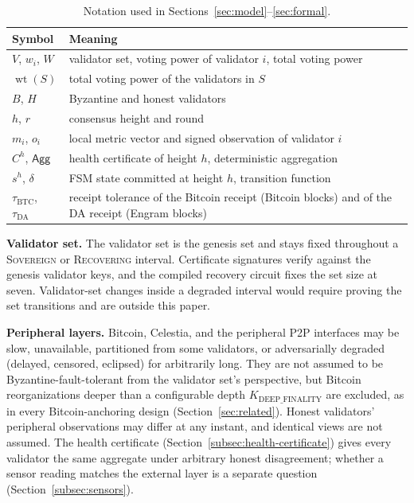 \begin{table}[tbp]
\caption{Notation used in Sections~\ref{sec:model}--\ref{sec:formal}.}
\label{tab:notation}
\centering
\footnotesize
\begin{tabular}{@{}ll@{}}
\toprule
\textbf{Symbol} & \textbf{Meaning} \\
\midrule
$V$, $w_i$, $W$ & validator set, voting power of validator $i$, total voting power \\
$\operatorname{wt}(S)$ & total voting power of the validators in $S$ \\
$B$, $H$ & Byzantine and honest validators \\
$h$, $r$ & consensus height and round \\
$m_i$, $o_i$ & local metric vector and signed observation of validator $i$ \\
$C^{h}$, $\mathsf{Agg}$ & health certificate of height $h$, deterministic aggregation \\
$s^{h}$, $\delta$ & FSM state committed at height $h$, transition function \\
$\tau_{\text{BTC}}$, $\tau_{\text{DA}}$ & receipt tolerance of the Bitcoin receipt (Bitcoin blocks) and of the DA receipt (Engram blocks) \\
\bottomrule
\end{tabular}
\end{table}

\textbf{Validator set.} The validator set is the genesis set and stays fixed
throughout a \textsc{Sovereign} or \textsc{Recovering} interval. Certificate
signatures verify against the genesis validator keys, and the compiled
recovery circuit fixes the set size at seven. Validator-set changes inside a
degraded interval would require proving the set transitions and are outside
this paper.

\textbf{Peripheral layers.} Bitcoin, Celestia, and the peripheral P2P
interfaces may be slow, unavailable, partitioned from some validators, or
adversarially degraded (delayed, censored, eclipsed) for arbitrarily long.
They are not assumed to be Byzantine-fault-tolerant from the validator set's
perspective, but Bitcoin reorganizations deeper than a configurable depth
$K_{\text{DEEP\_FINALITY}}$ are excluded, as in every Bitcoin-anchoring
design (Section~\ref{sec:related}). Honest validators' peripheral
observations may differ at any instant, and identical views are not assumed.
The health certificate (Section~\ref{subsec:health-certificate}) gives every
validator the same aggregate under arbitrary honest disagreement; whether a
sensor reading matches the external layer is a separate question
(Section~\ref{subsec:sensors}).

